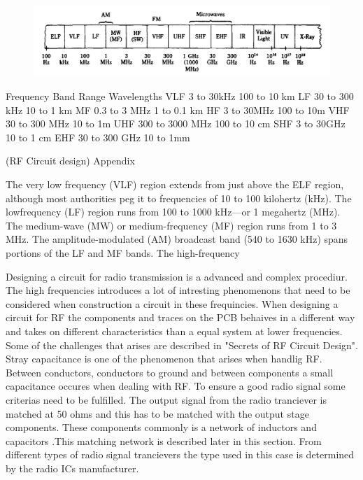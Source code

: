 \begin{figure}[H] 
	\centering 
	\includegraphics[width=.8\linewidth]{Figures/Full_frequency_band} 
	\label{fig:full_freq_band} 
\end{figure} 

Frequency Band Range Wavelengths
VLF 3 to 30kHz 100 to 10 km
LF 30 to 300 kHz 10 to 1 km
MF 0.3 to 3 MHz 1 to 0.1 km
HF 3 to 30MHz 100 to 10m
VHF 30 to 300 MHz 10 to 1m
UHF 300 to 3000 MHz 100 to 10 cm
SHF 3 to 30GHz 10 to 1 cm
EHF 30 to 300 GHz 10 to 1mm

(RF Circuit design) Appendix

The very low frequency (VLF) region extends from just above the ELF region,
although most authorities peg it to frequencies of 10 to 100 kilohertz (kHz). The lowfrequency
(LF) region runs from 100 to 1000 kHz—or 1 megahertz (MHz). The
medium-wave (MW) or medium-frequency (MF) region runs from 1 to 3 MHz. The
amplitude-modulated (AM) broadcast band (540 to 1630 kHz) spans portions of the
LF and MF bands.
The high-frequency

Designing a circuit for radio transmission is a advanced and complex procediur. The high frequencies introduces a lot of intresting phenomenons that need to be considered when construction a circuit in these frequincies. When designing a circuit for RF the components and traces on the PCB behaives in a different way and takes on different characteristics than a equal system at lower frequencies. Some of the challenges that arises are described in "Secrets of RF Circuit Design". Stray capacitance is one of the phenomenon that arises when handlig RF. Between conductors, conductors to ground and between components a small capacitance occures when dealing with RF. To ensure a good radio signal  some criterias need to be fulfilled. 
The output signal from the radio tranciever is matched at 50 ohms and this has to be matched with the output stage components. These components commonly is a network of inductors and capacitors .This matching network is described later in this section. 
From different types of radio signal trancievers the type used in this case is determined by the radio ICs manufacturer. %


